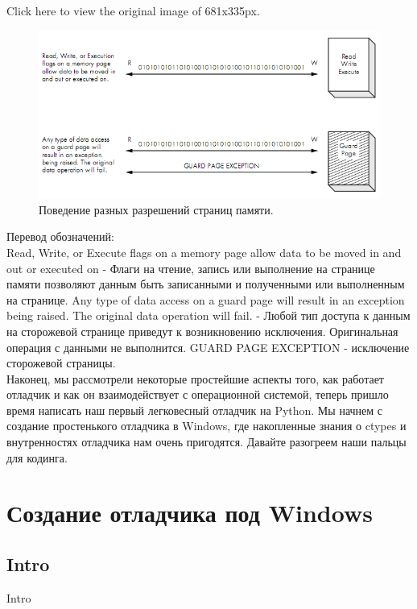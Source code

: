 \documentclass[12pt, a4paper, oneside]{book}
\begin{document}
Click here to view the original image of 681x335px.

\begin{figure}
  \center
  \includegraphics{./pic/chap2/6.PNG}
  \caption{Поведение разных разрешений страниц памяти.}
\end{figure}

Перевод обозначений:\\

    Read, Write, or Execute flags on a memory page allow data to be moved in and out or executed on - Флаги на чтение, запись или выполнение на странице памяти позволяют данным быть записанными и полученными или выполненным на странице.
    Any type of data access on a guard page will result in an exception being raised. The original data operation will fail. - Любой тип доступа к данным на сторожевой странице приведут к возникновению исключения. Оригинальная операция с данными не выполнится.
    GUARD PAGE EXCEPTION - исключение сторожевой страницы.\\

Наконец, мы рассмотрели некоторые простейшие аспекты того, как работает отладчик и как он взаимодействует с операционной системой, теперь пришло время написать наш первый легковесный отладчик на Python. Мы начнем с создание простенького отладчика в Windows, где накопленные знания о ctypes и внутренностях отладчика нам очень пригодятся. Давайте разогреем наши пальцы для кодинга.\\

\chapter{Создание отладчика под Windows}
\setcounter{subsection}{0}
\section*{Intro}Intro
\end{document}
